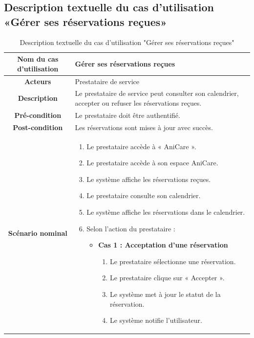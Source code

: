 \subsection{Description textuelle du cas d’utilisation «Gérer ses réservations reçues»} 
\begin{longtable}{|c|p{11cm}|}
\caption{Description textuelle du cas d’utilisation "Gérer ses réservations reçues"}
\label{tab:gerer_reservations_recues} \\
\hline
\cellcolor{coloranicare} \textbf{Nom du cas d'utilisation } & Gérer ses réservations reçues \\
\hline
\cellcolor{coloranicare} \textbf{Acteurs} & Prestataire de service \\
\hline
\cellcolor{coloranicare} \textbf{Description } & 
Le prestataire de service peut consulter son calendrier, accepter ou refuser les réservations reçues. \\
\hline

\cellcolor{coloranicare} \textbf{Pré-condition } & Le prestataire doit être authentifié. \\
\hline

\cellcolor{coloranicare} \textbf{Post-condition } & Les réservations sont mises à jour avec succès. \\
\hline

\cellcolor{coloranicare} \textbf{Scénario nominal } &
\begin{enumerate}
\item Le prestataire accède à « AniCare ».
\item Le prestataire accède à son espace AniCare.
\item Le système affiche les réservations reçues.
\item Le prestataire consulte son calendrier.
\item Le système affiche les réservations dans le calendrier.

\item Selon l’action du prestataire :

\begin{itemize}

\item \textbf{Cas 1 : Acceptation d’une réservation}
\begin{enumerate}
\item Le prestataire sélectionne une réservation.
\item Le prestataire clique sur « Accepter ».
\item Le système met à jour le statut de la réservation.
\item Le système notifie l’utilisateur.
\end{enumerate}


\end{itemize}
\end{enumerate}
\end{longtable}
